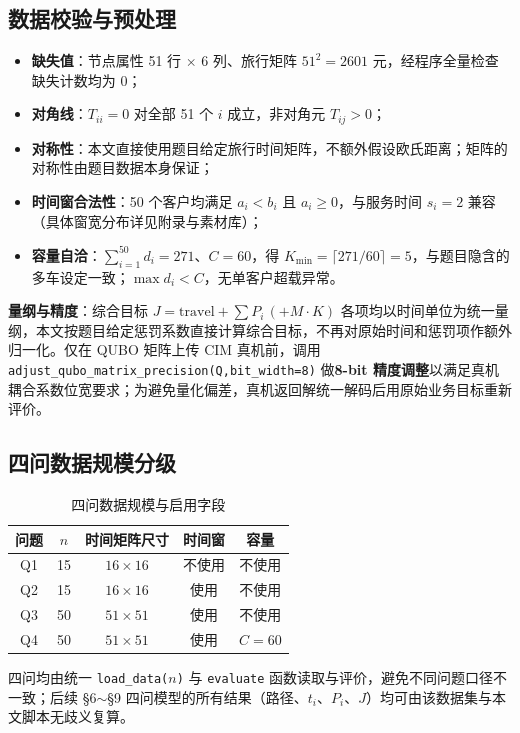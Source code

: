 \documentclass[UTF8,12pt,a4paper]{ctexart}
\begin{document}
\subsection{数据校验与预处理}

\begin{itemize}
    \item \textbf{缺失值}：节点属性 51 行 $\times$ 6 列、旅行矩阵 $51^{2}=2601$ 元，经程序全量检查缺失计数均为 0；
    \item \textbf{对角线}：$T_{ii}=0$ 对全部 51 个 $i$ 成立，非对角元 $T_{ij}>0$；
    \item \textbf{对称性}：本文直接使用题目给定旅行时间矩阵，不额外假设欧氏距离；矩阵的对称性由题目数据本身保证；
    \item \textbf{时间窗合法性}：50 个客户均满足 $a_i<b_i$ 且 $a_i\ge 0$，与服务时间 $s_i=2$ 兼容（具体窗宽分布详见附录与素材库）；
    \item \textbf{容量自洽}：$\sum_{i=1}^{50}d_i=271$、$C=60$，得 $K_{\min}=\lceil 271/60\rceil=5$，与题目隐含的多车设定一致；$\max d_i<C$，无单客户超载异常。
\end{itemize}

\noindent\textbf{量纲与精度}：综合目标 $J=\text{travel}+\sum P_i\,(+M\!\cdot\!K)$ 各项均以时间单位为统一量纲，本文按题目给定惩罚系数直接计算综合目标，不再对原始时间和惩罚项作额外归一化。仅在 QUBO 矩阵上传 CIM 真机前，调用 \texttt{adjust\_qubo\_matrix\_precision(Q,bit\_width=8)} 做\textbf{8-bit 精度调整}以满足真机耦合系数位宽要求；为避免量化偏差，真机返回解统一解码后用原始业务目标重新评价。

\subsection{四问数据规模分级}

\begin{table}[H]
    \centering
    \caption{四问数据规模与启用字段}
    \label{tab:scale}
    \begin{tabular}{c c c c c}
        \toprule
        问题 & $n$ & 时间矩阵尺寸 & 时间窗 & 容量 \\
        \midrule
        Q1 & 15 & $16\!\times\!16$ & 不使用 & 不使用 \\
        Q2 & 15 & $16\!\times\!16$ & 使用   & 不使用 \\
        Q3 & 50 & $51\!\times\!51$ & 使用   & 不使用 \\
        Q4 & 50 & $51\!\times\!51$ & 使用   & $C=60$ \\
        \bottomrule
    \end{tabular}
\end{table}

四问均由统一 \texttt{load\_data($n$)} 与 \texttt{evaluate} 函数读取与评价，避免不同问题口径不一致；后续 §6$\sim$§9 四问模型的所有结果（路径、$t_i$、$P_i$、$J$）均可由该数据集与本文脚本无歧义复算。
\end{document}
